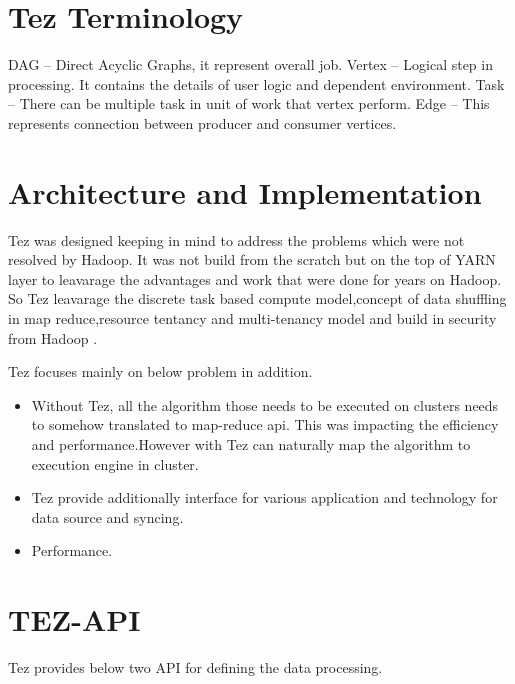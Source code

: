 \documentclass[9pt,twocolumn,twoside]{../../styles/osajnl}
\begin{document}
\section{Tez Terminology}


 DAG -- Direct Acyclic Graphs, it represent overall job.  
 Vertex -- Logical step in processing. It contains the details of user logic and dependent environment.
 Task --   There can be multiple task in unit of work that vertex perform. 
 Edge --  This represents connection between producer and consumer vertices.


\section{Architecture and Implementation}

Tez was designed keeping in mind to address the problems which were not resolved by Hadoop. 
It was not build from the scratch but on the top of YARN layer to leavarage the 
advantages and work that were done for years on Hadoop. So Tez leavarage the discrete task based compute model,concept of data shuffling in map reduce,resource tentancy and
multi-tenancy model and build in security from Hadoop . 

Tez focuses mainly on below problem in addition.

\begin{itemize}
\item Without Tez, all the algorithm those needs to be executed on clusters needs to somehow translated to map-reduce api. This was impacting the efficiency and performance.However with Tez can naturally map the algorithm to execution engine in cluster.
        
\item Tez provide additionally interface for various application and technology for data source and syncing.

\item Performance.
\end{itemize}	


\section{TEZ-API}

Tez provides below two API for defining the data processing. 
\end{document}
